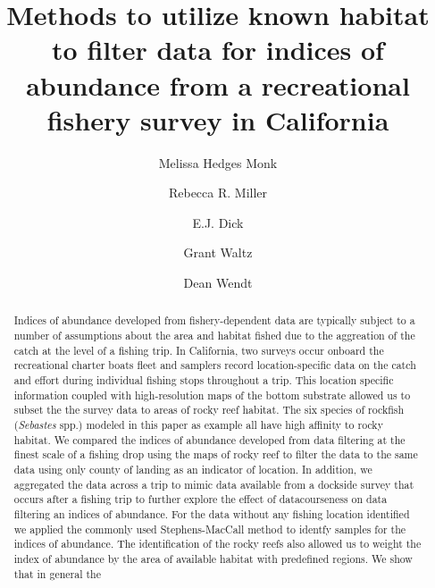 \documentclass[
  12pt,
  authoryear,
  preprint,
  3p]{elsarticle}
\begin{document}
\begin{frontmatter}
\title{Methods to utilize known habitat to filter data for indices of
abundance from a recreational fishery survey in California}
\author[1]{Melissa Hedges Monk%
%
}
\author[2]{Rebecca R. Miller%
%
}
\author[1]{E.J. Dick%
%
}
\author[33]{Grant Waltz%
%
}
\author[3]{Dean Wendt%
%
}









        
\begin{abstract}
Indices of abundance developed from fishery-dependent data are typically
subject to a number of assumptions about the area and habitat fished due
to the aggreation of the catch at the level of a fishing trip. In
California, two surveys occur onboard the recreational charter boats
fleet and samplers record location-specific data on the catch and effort
during individual fishing stops throughout a trip. This location
specific information coupled with high-resolution maps of the bottom
substrate allowed us to subset the the survey data to areas of rocky
reef habitat. The six species of rockfish (\emph{Sebastes} spp.) modeled
in this paper as example all have high affinity to rocky habitat. We
compared the indices of abundance developed from data filtering at the
finest scale of a fishing drop using the maps of rocky reef to filter
the data to the same data using only county of landing as an indicator
of location. In addition, we aggregated the data across a trip to mimic
data available from a dockside survey that occurs after a fishing trip
to further explore the effect of datacourseness on data filtering an
indices of abundance. For the data without any fishing location
identified we applied the commonly used Stephens-MacCall method to
identfy samples for the indices of abundance. The identification of the
rocky reefs also allowed us to weight the index of abundance by the area
of available habitat with predefined regions. We show that in general
the
\end{abstract}






\end{frontmatter}
\end{document}
